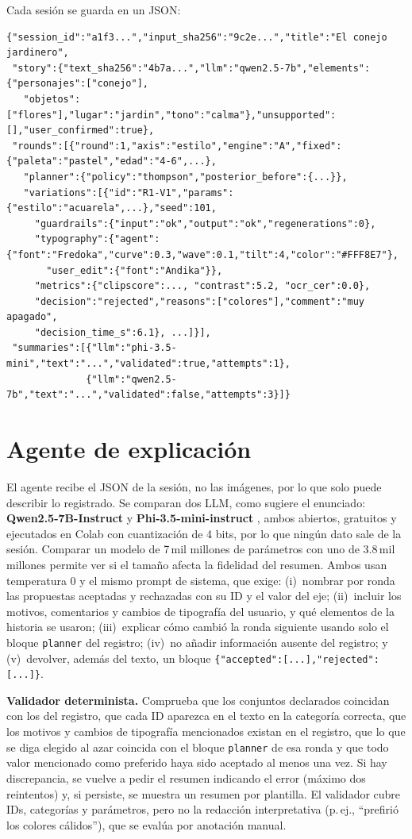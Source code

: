 \documentclass[10pt,a4paper,twocolumn]{article}
\begin{document}
Cada sesión se guarda en un JSON:
\begin{lstlisting}
{"session_id":"a1f3...","input_sha256":"9c2e...","title":"El conejo jardinero",
 "story":{"text_sha256":"4b7a...","llm":"qwen2.5-7b","elements":{"personajes":["conejo"],
   "objetos":["flores"],"lugar":"jardin","tono":"calma"},"unsupported":[],"user_confirmed":true},
 "rounds":[{"round":1,"axis":"estilo","engine":"A","fixed":{"paleta":"pastel","edad":"4-6",...},
   "planner":{"policy":"thompson","posterior_before":{...}},
   "variations":[{"id":"R1-V1","params":{"estilo":"acuarela",...},"seed":101,
     "guardrails":{"input":"ok","output":"ok","regenerations":0},
     "typography":{"agent":{"font":"Fredoka","curve":0.3,"wave":0.1,"tilt":4,"color":"#FFF8E7"},
       "user_edit":{"font":"Andika"}},
     "metrics":{"clipscore":..., "contrast":5.2, "ocr_cer":0.0},
     "decision":"rejected","reasons":["colores"],"comment":"muy apagado",
     "decision_time_s":6.1}, ...]}],
 "summaries":[{"llm":"phi-3.5-mini","text":"...","validated":true,"attempts":1},
              {"llm":"qwen2.5-7b","text":"...","validated":false,"attempts":3}]}
\end{lstlisting}

\section{Agente de explicación}
El agente recibe el JSON de la sesión, no las imágenes, por lo que solo puede describir lo registrado. Se comparan dos LLM, como sugiere el enunciado: \textbf{Qwen2.5-7B-Instruct} \citep{qwen2024} y \textbf{Phi-3.5-mini-instruct} \citep{abdin2024}, ambos abiertos, gratuitos y ejecutados en Colab con cuantización de 4 bits, por lo que ningún dato sale de la sesión. Comparar un modelo de 7\,mil millones de parámetros con uno de 3.8\,mil millones permite ver si el tamaño afecta la fidelidad del resumen. Ambos usan temperatura 0 y el mismo prompt de sistema, que exige:
(i)~nombrar por ronda las propuestas aceptadas y rechazadas con su ID y el valor del eje;
(ii)~incluir los motivos, comentarios y cambios de tipografía del usuario, y qué elementos de la historia se usaron;
(iii)~explicar cómo cambió la ronda siguiente usando solo el bloque \texttt{planner} del registro;
(iv)~no añadir información ausente del registro; y
(v)~devolver, además del texto, un bloque \lstinline[basicstyle=\ttfamily\footnotesize]|{"accepted":[...],"rejected":[...]}|.

\textbf{Validador determinista.} Comprueba que los conjuntos declarados coincidan con los del registro, que cada ID aparezca en el texto en la categoría correcta, que los motivos y cambios de tipografía mencionados existan en el registro, que lo que se diga elegido al azar coincida con el bloque \texttt{planner} de esa ronda y que todo valor mencionado como preferido haya sido aceptado al menos una vez. Si hay discrepancia, se vuelve a pedir el resumen indicando el error (máximo dos reintentos) y, si persiste, se muestra un resumen por plantilla. El validador cubre IDs, categorías y parámetros, pero no la redacción interpretativa (p.\,ej., ``prefirió los colores cálidos''), que se evalúa por anotación manual.
\end{document}
